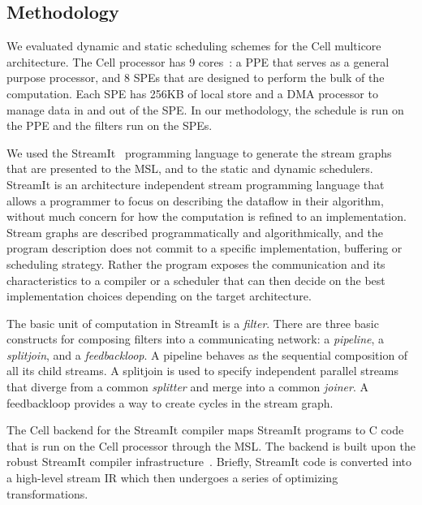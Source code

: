 \subsection{Methodology}

We evaluated dynamic and static scheduling schemes for the Cell
multicore architecture. The Cell processor has 9
cores~\cite{Cell-hpca}: a PPE that serves as a general purpose
processor, and 8 SPEs that are designed to perform the bulk of the
computation. Each SPE has 256KB of local store and a DMA processor to
manage data in and out of the SPE. In our methodology, the schedule is
run on the PPE and the filters run on the SPEs.

We used the StreamIt~\cite{streamitweb} programming language to
generate the stream graphs that are presented to the MSL, and to the
static and dynamic schedulers. StreamIt is an architecture independent
stream programming language that allows a programmer to focus on
describing the dataflow in their algorithm, without much concern for
how the computation is refined to an implementation. Stream graphs are
described programmatically and algorithmically, and the program
description does not commit to a specific implementation, buffering or
scheduling strategy. Rather the program exposes the communication and
its characteristics to a compiler or a scheduler that can then decide
on the best implementation choices depending on the target
architecture.

The basic unit of computation in StreamIt is a  {\it filter}. There
are three basic constructs for composing filters into a communicating
network: a {\it pipeline}, a {\it splitjoin}, and a {\it
feedbackloop}. A pipeline behaves as the sequential composition of all
its child streams. A splitjoin is used to specify independent parallel
streams that diverge from a common {\it splitter} and merge into a
common {\it joiner}. A feedbackloop provides a way to create cycles in
the stream graph.

The Cell backend for the StreamIt compiler maps StreamIt programs to C
code that is run on the Cell processor through the MSL. The backend is
built upon the robust StreamIt compiler
infrastructure~\cite{asplos06}.  Briefly, StreamIt code is converted
into a high-level stream IR which then undergoes a series of
optimizing transformations.


